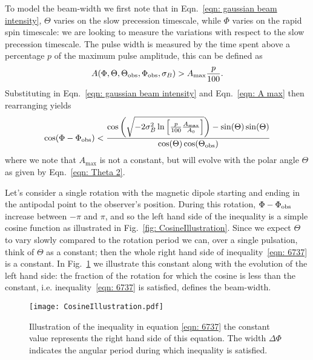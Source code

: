 \documentclass[../full_thesis/full_thesis.tex]{subfiles}
\begin{document}
To model the beam-width we first note that in Eqn.~\eqref{eqn: gaussian beam intensity},
$\Theta$ varies on the slow precession timescale, while $\Phi$ varies on the
rapid spin timescale: we are looking to measure the variations with respect to
the slow precession timescale.  The pulse width is measured by the time spent
above a percentage $p$ of the maximum pulse amplitude, this can be defined as
\begin{align}
A(\Phi, \Theta, \Theta_{\mathrm{obs}}, \Phi_{\mathrm{obs}}, \sigma_{B}) > A_{\textrm{max}} \frac{p}{100}.
\end{align}
Substituting in Eqn.~\eqref{eqn: gaussian beam intensity} and Eqn.~\eqref{eqn: A max}
then rearranging yields
\begin{equation}
\cos(\Phi - \Phi_{\mathrm{obs}}) < \frac{
\cos\left(
\sqrt{-2\sigma_{B}^{2} \ln\left[\frac{p}{100}\frac{A_\textrm{max}}{A_0}\right]}\right) - \sin(\Theta)\sin(\Theta)}
                          {\cos(\Theta)\cos(\Theta_{\mathrm{obs}})}
\label{eqn: 6737}
\end{equation}
where we note that $A_\textrm{max}$ is not a constant, but will evolve with the
polar angle $\Theta$ as given by Eqn.~\eqref{eqn: Theta 2}.

Let's consider a single rotation with the magnetic dipole starting and ending in
the antipodal point to the observer's position. During this rotation, $\Phi -
\Phi_{\mathrm{obs}}$ increase between $-\pi$ and $\pi$, and so the left hand side of the
inequality is a simple cosine function as illustrated in Fig.~\ref{fig:
CosineIllustration}.  Since we expect $\Theta$ to vary slowly compared to the
rotation period we can, over a single pulsation, think of $\Theta$ as a
constant; then the whole right hand side of inequality~\eqref{eqn: 6737} is a
constant. In Fig.~\ref{fig: CosineIllustration} we illustrate this constant
along with the evolution of the left hand side: the fraction of the rotation
for which the cosine is less than the constant, i.e. inequality~\eqref{eqn: 6737}
is satisfied, defines the beam-width.
\begin{figure}[ht]
\centering
\texttt{[image: CosineIllustration.pdf]}
\caption{Illustration of the inequality in equation \eqref{eqn: 6737} the constant
         value represents the right hand side of this equation. The
         width $\Delta\Phi$ indicates the angular period during which inequality
         is satisfied.}
\label{fig: CosineIllustration}
\end{figure}
\end{document}

